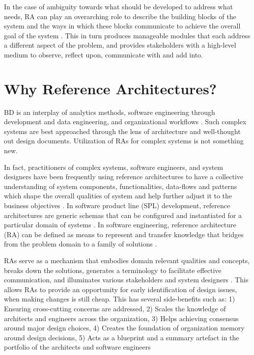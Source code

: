 \documentclass[conference]{IEEEtran}
\begin{document}
In the case of ambiguity towards what should be developed to address what needs, RA can play an overarching role to describe the building blocks of the system and the ways in which these blocks communicate to achieve the overall goal of the system \cite{Sievi-Korte}. This in turn produces manageable modules that each address a different aspect of the problem, and provides stakeholders with a high-level medium to observe, reflect upon, communicate with and add into.


\section{Why Reference Architectures?}

BD is an interplay of analytics methods, software engineering through development and data engineering, and organizational workflows \cite{Mannering,Selamat}. Such complex systems are best approached through the lens of architecture and well-thought out design documents. Utilization of RAs for complex systems is not something new.

In fact, practitioners of complex systems, software engineers, and system designers have been frequently using reference architectures to have a collective understanding of system components, functionalities, data-flows and patterns which shape the overall qualities of system and help further adjust it to the business objectives \cite{Kohler,Cloutier}. In software product line (SPL) development, reference architectures are generic schemas that can be configured and instantiated for a particular domain of systems \cite{Derras}. In software engineering, reference architecture (RA) can be defined as means to represent and transfer knowledge that bridges from the problem domain to a family of solutions \cite{Klein}.

RAs serve as a mechanism that embodies domain relevant qualities and concepts, breaks down the solutions, generates a terminology to facilitate effective communication, and illuminates various stakeholders and system designers \cite{Klein}. This allows RAs to provide an opportunity for early identification of design issues, when making changes is still cheap. This has several side-benefits such as: 1) Ensuring cross-cutting concerns are addressed, 2) Scales the knowledge of architects and engineers across the organization, 3) Helps achieving consensus around major design choices, 4) Creates the foundation of organization memory around design decisions, 5) Acts as a blueprint and a summary artefact in the portfolio of the architects and software engineers
\end{document}
